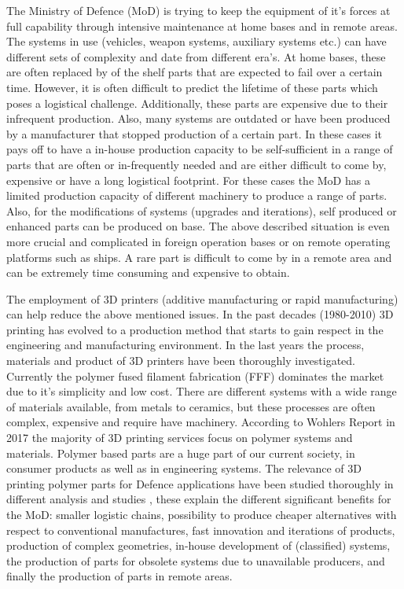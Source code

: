 The Ministry of Defence (MoD) is trying to keep the equipment of it's forces at full capability through intensive maintenance at home bases and in remote areas. The systems in use (vehicles, weapon systems, auxiliary systems etc.) can have different sets of complexity and date from different era's. At home bases, these are often replaced by of the shelf parts that are expected to fail over a certain time. However, it is often difficult to predict the lifetime of these parts which poses a logistical challenge. Additionally, these parts are expensive due to their infrequent production. Also, many systems are outdated or have been produced by a manufacturer that stopped production of a certain part. In these cases it pays off to have a in-house production capacity to be self-sufficient in a range of parts that are often or in-frequently needed and are either difficult to come by, expensive or have a long logistical footprint. For these cases the MoD has a limited production capacity of different machinery to produce a range of parts. Also, for the modifications of systems (upgrades and iterations), self produced or enhanced parts can be produced on base. The above described situation is even more crucial and complicated in foreign operation bases or on remote operating platforms such as ships. A rare part is difficult to come by in a remote area and can be extremely time consuming and expensive to obtain. 

The employment of 3D printers (additive manufacturing or rapid manufacturing) can help reduce the above mentioned issues. In the past decades (1980-2010) 3D printing has evolved to a production method that starts to gain respect in the engineering and manufacturing environment. In the last years the process, materials and product of 3D printers have been thoroughly investigated. Currently the polymer fused filament fabrication (FFF) dominates the market due to it's simplicity and low cost. There are different systems with a wide range of materials available, from metals to ceramics, but these processes are often complex, expensive and require have machinery. According to Wohlers Report in 2017 \cite{WohlersAssociates2017WohlersIndustry} the majority of 3D printing services focus on polymer systems and materials. Polymer based parts are a huge part of our current society, in consumer products as well as in engineering systems. The relevance of 3D printing polymer parts for Defence applications have been studied thoroughly in different analysis and studies \cite{Bastiaans2015DeDefensie} \cite{NATOPerspectivesOperations} \cite{Joyce20143DDefense}, these explain the different significant benefits for the MoD: smaller logistic chains, possibility to produce cheaper alternatives with respect to conventional manufactures, fast innovation and iterations of products, production of complex geometries, in-house development of (classified) systems, the production of parts for obsolete systems due to unavailable producers, and finally the production of parts in remote areas.

